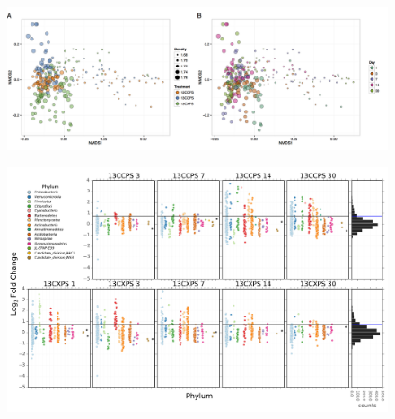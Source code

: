 \begin{figure}[H]
	\begin{center}
	\centerline{\includegraphics[width=\textwidth]{figures/ordination_all1/ordination_all1.png}}
	\caption{\protect}
        \end{center}
	\label{fig:ord}
\end{figure}

\begin{figure}[H]
	\begin{center}
	\centerline{\includegraphics[width=\textwidth]{figures/l2fc_fig1/l2fc_fig.pdf}}
	\caption{\protect}
        \end{center}
	\label{fig:l2fc}
\end{figure}

